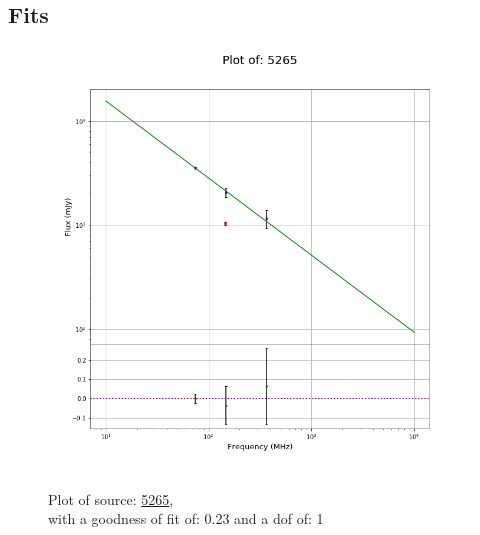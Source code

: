 \documentclass{article}
\begin{document}
\subsection{Fits}
\begin{figure}[H]
    \centering
    \begin{minipage}{.5\textwidth}
        \centering
        \includegraphics[scale = 0.35]{KmeulenSimSource_1hr/1hr5265.png}
        \captionsetup{labelformat=empty}
        \caption{Plot of source: \href{http://banana.transientskp.org/r4/vlo_KmeulenSimSource/runningcatalog/5265}{5265},\\with a goodness of fit of: 0.23 and a dof of: 1}
        \addtocounter{figure}{-1}
        \label{KmeulenSimSource:1hr:5265:plot}
    \end{minipage}%
    \begin{minipage}{0.5\textwidth}
        \centering


\end{minipage}
\end{figure}
\end{document}
